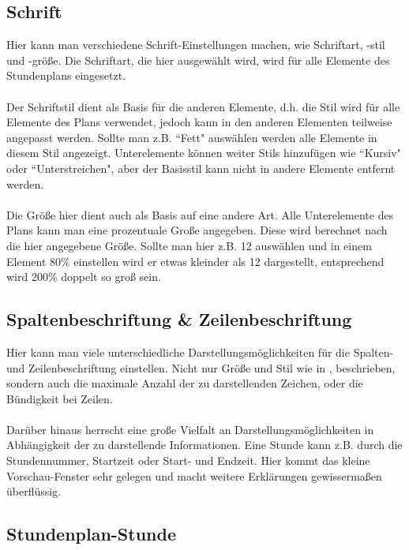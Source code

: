 \subsection{Schrift}
\label{sec:schrift}

Hier kann man verschiedene Schrift-Einstellungen machen, wie Schriftart, -stil und -größe. Die Schriftart, die hier ausgewählt wird, wird für alle Elemente des Stundenplans eingesetzt.\\
\\
Der Schriftstil dient als Basis für die anderen Elemente, d.h. die Stil wird für alle Elemente des Plans verwendet, jedoch kann in den anderen Elementen teilweise angepasst werden. Sollte man z.B. ``Fett" \hspace{1pt} auswählen werden alle Elemente in diesem Stil angezeigt. Unterelemente können weiter Stils hinzufügen wie ``Kursiv" \hspace{1pt} oder ``Unterstreichen", aber der Basisstil kann nicht in andere Elemente entfernt werden.\\
\\
Die Größe hier dient auch als Basis auf eine andere Art. Alle Unterelemente des Plans kann man eine prozentuale Große angegeben. Diese wird berechnet nach die hier angegebene Größe. Sollte man hier z.B. 12 auswählen und in einem Element 80\% einstellen wird er etwas kleinder als 12 dargestellt, entsprechend wird 200\% doppelt so groß sein.

\subsection{Spaltenbeschriftung \& Zeilenbeschriftung}

Hier kann man viele unterschiedliche Darstellungsmöglichkeiten für die Spalten- und Zeilenbeschriftung einstellen. Nicht nur Größe und Stil wie in , beschrieben, sondern auch die maximale Anzahl der zu darstellenden Zeichen, oder die Bündigkeit bei Zeilen.\\
\\
Darüber hinaus herrscht eine große Vielfalt an Darstellungsmöglichkeiten in Abhängigkeit der zu darstellende Informationen. Eine Stunde kann z.B. durch die Stundennummer, Startzeit oder Start- und Endzeit. Hier kommt das kleine Vorschau-Fenster sehr gelegen und macht weitere Erklärungen gewissermaßen überflüssig.

\subsection{Stundenplan-Stunde}
\label{sec:stundenplan-stunde}

